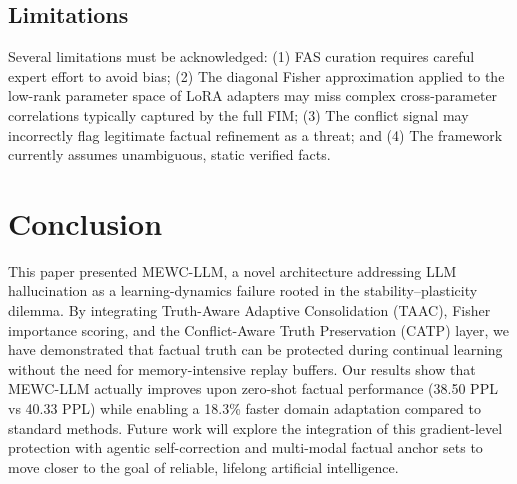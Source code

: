 \documentclass[10pt, conference, letterpaper]{IEEEtran}
\begin{document}
\subsection{Limitations}
Several limitations must be acknowledged: (1) FAS curation requires careful expert effort to avoid bias; (2) The diagonal Fisher approximation applied to the low-rank parameter space of LoRA adapters may miss complex cross-parameter correlations typically captured by the full FIM; (3) The conflict signal may incorrectly flag legitimate factual refinement as a threat; and (4) The framework currently assumes unambiguous, static verified facts.

\section{Conclusion}
This paper presented MEWC-LLM, a novel architecture addressing LLM hallucination as a learning-dynamics failure rooted in the stability--plasticity dilemma. By integrating Truth-Aware Adaptive Consolidation (TAAC), Fisher importance scoring, and the Conflict-Aware Truth Preservation (CATP) layer, we have demonstrated that factual truth can be protected during continual learning without the need for memory-intensive replay buffers. Our results show that MEWC-LLM actually improves upon zero-shot factual performance (38.50 PPL vs 40.33 PPL) while enabling a 18.3\% faster domain adaptation compared to standard methods. Future work will explore the integration of this gradient-level protection with agentic self-correction and multi-modal factual anchor sets to move closer to the goal of reliable, lifelong artificial intelligence.
\end{document}
